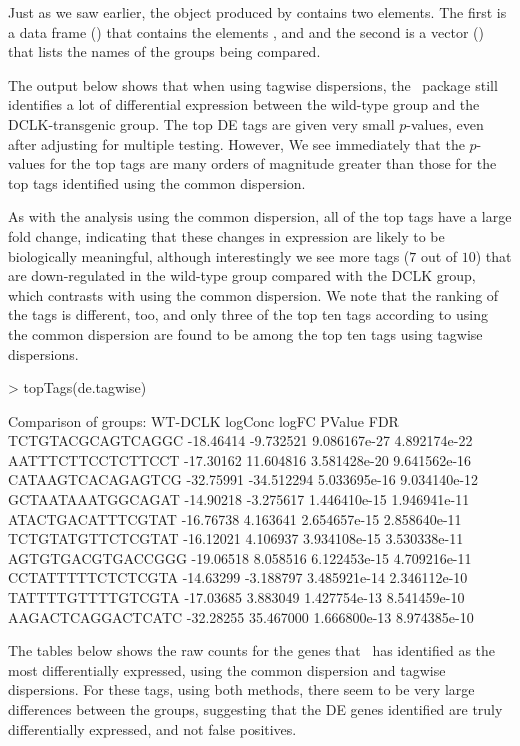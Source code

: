 Just as we saw earlier, the object produced by 
contains two elements. The first is a data frame () that
contains the elements ,  and 
and the second is a vector () that lists the names of
the groups being compared.

The output below shows that when using tagwise dispersions, the
\edgeR~package still identifies a lot of differential expression
between the wild-type group and the DCLK-transgenic group. The top DE
tags are given very small $p$-values, even after adjusting for
multiple testing. However, We see immediately that the $p$-values for
the top tags are many orders of magnitude greater than those for the
top tags identified using the common dispersion.

As with the analysis using the common dispersion, all of the top tags
have a large fold change, indicating that these changes in expression
are likely to be biologically meaningful, although interestingly we
see more tags ($7$ out of $10$) that are down-regulated in the
wild-type group compared with the DCLK group, which contrasts with
using the common dispersion. We note that the ranking of the tags is
different, too, and only three of the top ten tags according to using
the common dispersion are found to be among the top ten tags using
tagwise dispersions.

\begin{Schunk}
\begin{Sinput}
> topTags(de.tagwise)
\end{Sinput}
\begin{Soutput}
Comparison of groups: WT-DCLK 
                    logConc      logFC       PValue          FDR
TCTGTACGCAGTCAGGC -18.46414  -9.732521 9.086167e-27 4.892174e-22
AATTTCTTCCTCTTCCT -17.30162  11.604816 3.581428e-20 9.641562e-16
CATAAGTCACAGAGTCG -32.75991 -34.512294 5.033695e-16 9.034140e-12
GCTAATAAATGGCAGAT -14.90218  -3.275617 1.446410e-15 1.946941e-11
ATACTGACATTTCGTAT -16.76738   4.163641 2.654657e-15 2.858640e-11
TCTGTATGTTCTCGTAT -16.12021   4.106937 3.934108e-15 3.530338e-11
AGTGTGACGTGACCGGG -19.06518   8.058516 6.122453e-15 4.709216e-11
CCTATTTTTCTCTCGTA -14.63299  -3.188797 3.485921e-14 2.346112e-10
TATTTTGTTTTGTCGTA -17.03685   3.883049 1.427754e-13 8.541459e-10
AAGACTCAGGACTCATC -32.28255  35.467000 1.666800e-13 8.974385e-10
\end{Soutput}
\end{Schunk}

The tables below shows the raw counts for the genes that \edgeR~has
identified as the most differentially expressed, using the common
dispersion and tagwise dispersions. For these tags, using both
methods, there seem to be very large differences between the groups,
suggesting that the DE genes identified are truly differentially
expressed, and not false positives.

